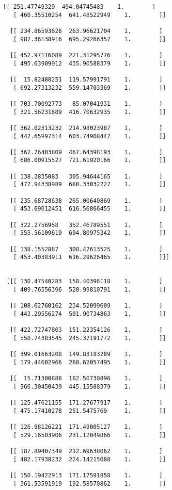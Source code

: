\documentclass[11pt]{article}
\begin{document}
\begin{Verbatim}[commandchars=\\\{\}]
  [[ 251.47749329  494.04745483    1.        ]
   [ 460.35510254  641.48522949    1.        ]]

  [[ 234.86593628  263.96621704    1.        ]
   [ 987.36138916  695.29266357    1.        ]]

  [[ 452.97116089  221.31295776    1.        ]
   [ 495.63909912  435.90588379    1.        ]]

  [[  15.82488251  119.57991791    1.        ]
   [ 692.27313232  559.14703369    1.        ]]

  [[ 703.70092773   85.07041931    1.        ]
   [ 321.56231689  416.70632935    1.        ]]

  [[ 362.02313232  214.98023987    1.        ]
   [ 447.65997314  603.74908447    1.        ]]

  [[ 362.76403809  467.64398193    1.        ]
   [ 686.00915527  721.61920166    1.        ]]

  [[ 138.2835083   305.94644165    1.        ]
   [ 472.94338989  680.33032227    1.        ]]

  [[ 235.68728638  265.00640869    1.        ]
   [ 453.69012451  616.56866455    1.        ]]

  [[ 322.2756958   352.46789551    1.        ]
   [ 555.56109619  694.80975342    1.        ]]

  [[ 138.1552887   308.47613525    1.        ]
   [ 453.40383911  616.29626465    1.        ]]]


 [[[ 130.47540283  158.40396118    1.        ]
   [ 409.76556396  520.99810791    1.        ]]

  [[ 108.62760162  234.52099609    1.        ]
   [ 443.29556274  501.90734863    1.        ]]

  [[ 422.72747803  151.22354126    1.        ]
   [ 558.74383545  245.37191772    1.        ]]

  [[ 399.01663208  149.83183289    1.        ]
   [ 179.44602966  268.62057495    1.        ]]

  [[  15.71300888  182.50730896    1.        ]
   [ 566.30450439  445.15588379    1.        ]]

  [[ 125.47621155  171.27677917    1.        ]
   [ 475.17410278  251.5475769     1.        ]]

  [[ 126.98126221  171.49005127    1.        ]
   [ 529.16503906  231.12049866    1.        ]]

  [[ 187.89407349  212.69638062    1.        ]
   [ 482.17938232  224.14215088    1.        ]]

  [[ 150.19422913  171.17591858    1.        ]
   [ 361.53591919  192.58570862    1.        ]]


\end{Verbatim}
\end{document}
